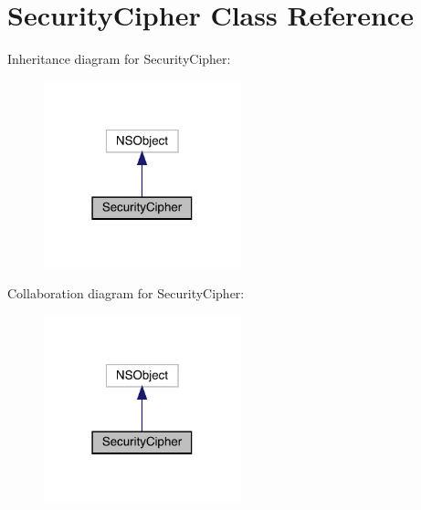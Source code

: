 \hypertarget{interface_security_cipher}{}\section{Security\+Cipher Class Reference}
\label{interface_security_cipher}


Inheritance diagram for Security\+Cipher\+:\nopagebreak
\begin{figure}[H]
\begin{center}
\leavevmode
\includegraphics[width=162pt]{interface_security_cipher__inherit__graph}
\end{center}
\end{figure}


Collaboration diagram for Security\+Cipher\+:\nopagebreak
\begin{figure}[H]
\begin{center}
\leavevmode
\includegraphics[width=162pt]{interface_security_cipher__coll__graph}
\end{center}
\end{figure}
